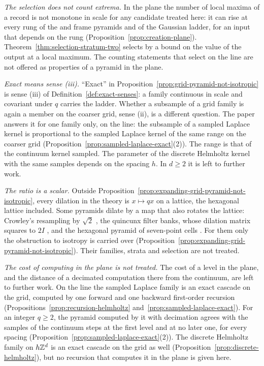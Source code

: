 \emph{The selection does not count extrema.} In the plane the number of local maxima of a record is not
monotone in scale for any candidate treated here: it can rise at every rung of the \Matern{} and
frame \Matern{} pyramids and of the Gaussian ladder, for an input that depends on the rung
(Proposition~\ref{prop:creation-plane}).
Theorem~\ref{thm:selection-stratum-two} selects by a bound on the value of the output at a local
maximum. The counting statements that select on the line  are not
offered as properties of a pyramid in the plane.

\emph{Exact means sense (iii).} ``Exact'' in Proposition~\ref{prop:grid-pyramid-not-isotropic} is
sense (iii) of Definition~\ref{def:exact-senses}: a family continuous in scale and covariant under
$q$ carries the ladder.
Whether a subsample of a grid family is again a member on the coarser grid, sense (ii), is a
different question. The paper answers it for one family only, on the line: the subsample of a
sampled Laplace kernel is proportional to the sampled Laplace kernel of the same range on the
coarser grid (Proposition~\ref{prop:sampled-laplace-exact}(2)). The range is that of the continuum
kernel sampled. The parameter of the discrete Helmholtz kernel with the same samples depends on
the spacing $h$. In $d \ge 2$ it is left to further
work.

\emph{The ratio is a scalar.} Outside
Proposition~\ref{prop:expanding-grid-pyramid-not-isotropic}, every dilation in the theory is
$x \mapsto qx$ on a lattice, the hexagonal lattice included. Some pyramids dilate by a map that also rotates the lattice: Crowley's
resampling by $\sqrt2$ \cite[\S 3.3.2, p.~32]{crowley1981representation}, the quincunx filter banks,
whose dilation matrix squares to $2I$ \cite[(2), p.~534]{kovacevic1992nonseparable}, and the
hexagonal pyramid of seven-point cells \cite[pp.~97, 99]{watson1989hexagonal}. For them only the
obstruction to isotropy is carried over
(Proposition~\ref{prop:expanding-grid-pyramid-not-isotropic}). Their families, strata and selection
are not treated.

\emph{The cost of computing in the plane is not treated.} The cost of a level in the plane, and the
distance of a decimated computation there from the continuum, are left to further work. On the
line the sampled Laplace family is an exact cascade on the grid, computed by one forward and one
backward first-order recursion (Propositions~\ref{prop:recursion-helmholtz}
and~\ref{prop:sampled-laplace-exact}). For an integer $q \ge 2$, the \Matern{} pyramid computed by
it with decimation agrees with the samples of the continuum steps at the first level and at no
later one, for every spacing (Proposition~\ref{prop:sampled-laplace-exact}(2)). The discrete
Helmholtz family on $h\mathbb{Z}^d$ is an exact cascade on the grid as well
(Proposition~\ref{prop:discrete-helmholtz}), but no recursion that computes it in the plane is
given here.

